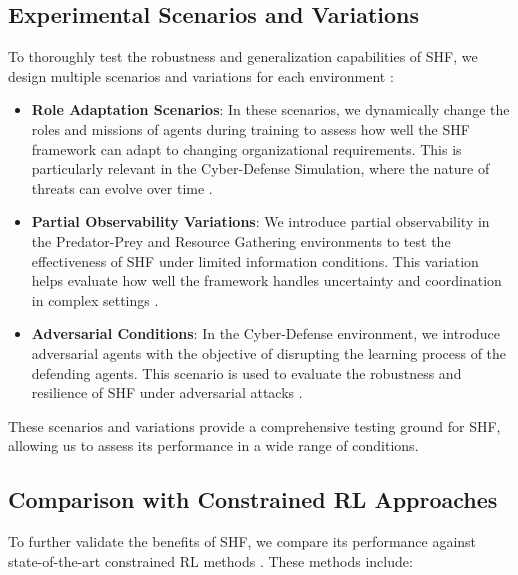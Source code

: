 \documentclass[sigconf,anonymous]{aamas}
\begin{document}

\subsection{Experimental Scenarios and Variations}
To thoroughly test the robustness and generalization capabilities of SHF, we design multiple scenarios and variations for each environment \cite{foerster2018counterfactual}:

\begin{itemize}
    \item \textbf{Role Adaptation Scenarios}: In these scenarios, we dynamically change the roles and missions of agents during training to assess how well the SHF framework can adapt to changing organizational requirements. This is particularly relevant in the Cyber-Defense Simulation, where the nature of threats can evolve over time \cite{bastani2018verifiable, su2021toward}.
    \item \textbf{Partial Observability Variations}: We introduce partial observability in the Predator-Prey and Resource Gathering environments to test the effectiveness of SHF under limited information conditions. This variation helps evaluate how well the framework handles uncertainty and coordination in complex settings \cite{foerster2018counterfactual}.
    \item \textbf{Adversarial Conditions}: In the Cyber-Defense environment, we introduce adversarial agents with the objective of disrupting the learning process of the defending agents. This scenario is used to evaluate the robustness and resilience of SHF under adversarial attacks \cite{wei2019safe, bastani2018verifiable}.
\end{itemize}


These scenarios and variations provide a comprehensive testing ground for SHF, allowing us to assess its performance in a wide range of conditions.

\subsection{Comparison with Constrained RL Approaches}
To further validate the benefits of SHF, we compare its performance against state-of-the-art constrained RL methods \cite{wei2019safe}. These methods include:
\end{document}
